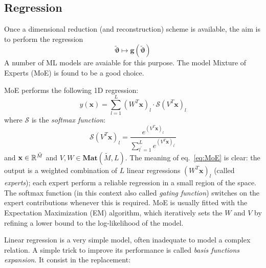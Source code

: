 \par

\subsection{Regression}
Once a dimensional reduction (and reconstruction) scheme is available, the aim is to perform the regression
\begin{equation} \label{eq:regression_model}
	{\tilde{\boldsymbol{\vartheta}}} \longmapsto \boldsymbol{g}({\tilde{\boldsymbol{\vartheta}}})
\end{equation}
A number of ML models are avaiable for this purpose. The model Mixture of Experts (MoE) \cite{Jacobs1991AdaptiveMoE} \cite[ch. 11]{murphy2012machine} is found to be a good choice.
\par
MoE performs the following 1D regression:
\begin{equation} \label{eq:MoE}
	y(\mathbf{x}) = \sum_{l=1}^L (W^T \mathbf{x})_l \cdot \mathcal{S}(V^T\mathbf{x})_l
\end{equation}
where $\mathcal{S}$ is the \textit{softmax function}:
\begin{equation} \label{eq:softmax}
	\mathcal{S}(V^T{\mathbf{x}})_l = \frac{e^{(V^T{\mathbf{x}})_l}}{\sum_{l^\prime = 1}^L e^{(V^T{\mathbf{x}})_{l^\prime}}}
\end{equation}
and ${\mathbf{x}} \in \mathbb{R}^{\tilde{M}}$ and $V,W \in \mathbf{Mat}(\tilde{M},L)$.
The meaning of eq.~\eqref{eq:MoE} is clear: the output is a weighted combination of $L$ linear regressions $(W^T \mathbf{x})_l$ (called \textit{experts}); each expert perform a reliable regression in a small region of the space. The softmax function (in this context also called \textit{gating function}) switches on the expert contributions whenever this is required.
MoE is usually fitted with the Expectation Maximization (EM) algorithm, which iteratively sets the $W$ and $V$ by refining a lower bound to the log-likelihood of the model.
\par
Linear regression is a very simple model, often inadequate to model a complex relation. A simple trick to improve its performance is called \textit{basis functions expansion}. It consist in the replacement:
